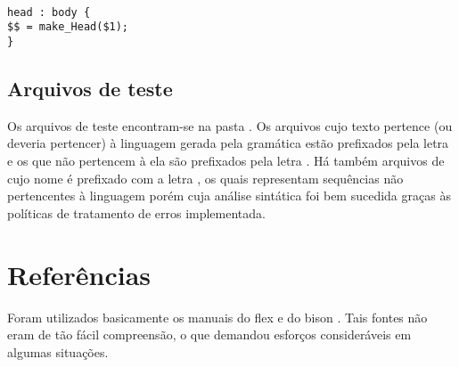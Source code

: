 \documentclass[
	article,			%
	11pt,				%
	oneside,			%
	a4paper,			%
	english,			%
	brazil,				%
	sumario=tradicional
	]{abntex2}
\begin{document}
\begin{lstlisting}[style=CStyle]

head : body {
$$ = make_Head($1);
}
\end{lstlisting}


\subsection{Arquivos de teste}
Os arquivos de teste encontram-se na pasta . Os arquivos cujo texto pertence (ou deveria pertencer) à linguagem gerada pela gramática estão prefixados pela letra  e os que não pertencem à ela são prefixados pela letra . Há também arquivos de cujo nome é prefixado com a letra , os quais representam sequências não pertencentes à linguagem porém cuja análise sintática foi bem sucedida graças às políticas de tratamento de erros implementada.

\section{Referências}
Foram utilizados basicamente os manuais do flex \cite{flex} e do bison \cite{bison}.
Tais fontes não eram de tão fácil compreensão, o que demandou esforços consideráveis em algumas situações.
% 

\postextual


\end{document}
